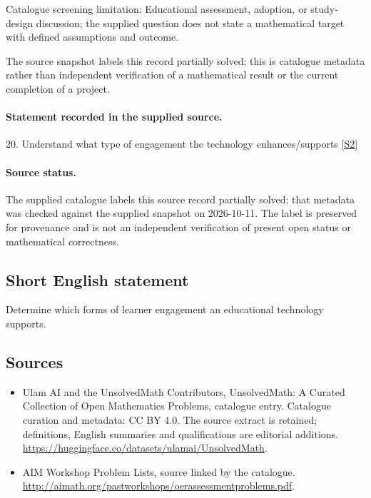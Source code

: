 \documentclass[11pt]{article}
\begin{document}
Catalogue screening limitation: Educational assessment, adoption, or study-design discussion; the supplied question does not state a mathematical target with defined assumptions and outcome.

The source snapshot labels this record partially solved; this is catalogue metadata rather than independent verification of a mathematical result or the current completion of a project.
\paragraph{Statement recorded in the supplied source.}
20. Understand what type of engagement the technology enhances/supports \href{http://aimath.org/pastworkshops/oerassessmentproblems.pdf}{[S2]}
\paragraph{Source status.}
The supplied catalogue labels this source record partially solved; that metadata was checked against the supplied snapshot on 2026-10-11. The label is preserved for provenance and is not an independent verification of present open status or mathematical correctness.
\subsection{Short English statement}
Determine which forms of learner engagement an educational technology supports.
\subsection{Sources}
\begin{itemize}
\item[S1] Ulam AI and the UnsolvedMath Contributors, UnsolvedMath: A Curated Collection of Open Mathematics Problems, catalogue entry. Catalogue curation and metadata: CC BY 4.0. The source extract is retained; definitions, English summaries and qualifications are editorial additions.
\url{https://huggingface.co/datasets/ulamai/UnsolvedMath}.
\item[S2] AIM Workshop Problem Lists, source linked by the catalogue.
\url{http://aimath.org/pastworkshops/oerassessmentproblems.pdf}.
\end{itemize}
\end{document}
